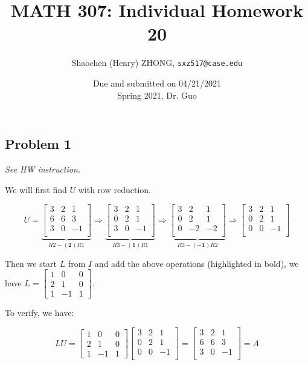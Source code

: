 \documentclass[11pt]{article}
\newcommand{\ilc}{\texttt}
\providecommand{\qbm}[1]{\begin{bmatrix} #1 \end{bmatrix}}
\begin{document}
\title{\textbf{MATH 307: Individual Homework 20}}


\author{Shaochen (Henry) ZHONG, \ilc{sxz517@case.edu}}

\date{Due and submitted on 04/21/2021 \\ Spring 2021, Dr. Guo}
\maketitle



\subsection*{Problem 1}
\textit{See HW instruction.}\newline

We will first find $U$ with row reduction.

\begin{equation*}
    U = \underbrace{\qbm{3 & 2 & 1 \\ 6 & 6 & 3 \\ 3 & 0 & -1 \\}}_{R2 - \mathbf{(2)}R1} \Rightarrow \underbrace{\qbm{3 & 2 & 1 \\ 0 & 2 & 1 \\ 3 & 0 & -1 \\}}_{R3 - \mathbf{(1)}R1} \Rightarrow \underbrace{\qbm{3 & 2 & 1 \\ 0 & 2 & 1 \\ 0 & -2 & -2 \\}}_{R3 - \mathbf{(-1)}R2} \Rightarrow \qbm{3 & 2 & 1 \\ 0 & 2 & 1 \\ 0 & 0 & -1 \\}
\end{equation*}

Then we start $L$ from $I$ and add the above operations (highlighted in bold), we have $L = \qbm{1 & 0 & 0 \\ 2 & 1 & 0 \\ 1 & -1 & 1}$.

To verify, we have:

\begin{equation*}
    LU = \qbm{1 & 0 & 0 \\ 2 & 1 & 0 \\ 1 & -1 & 1} \qbm{3 & 2 & 1 \\ 0 & 2 & 1 \\ 0 & 0 & -1 \\} = \qbm{3 & 2 & 1 \\ 6 & 6 & 3 \\ 3 & 0 & -1 \\} = A
\end{equation*}
\end{document}
